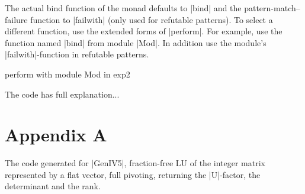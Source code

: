 \documentclass[draft]{elsart}
\begin{document}
The actual bind function of the monad defaults to |bind| and the
pattern-match--failure function to |failwith| (only used for refutable
patterns).  To select a different function, use the
extended forms of |perform|. For example, use the function named 
|bind| from module |Mod|.  In
addition use the module's |failwith|-function in refutable patterns.
\begin{code}
        perform with module Mod in exp2
\end{code}
The code has full explanation...

\section{Appendix A}
The code generated for |GenIV5|, fraction-free LU of the integer matrix
represented by a flat vector, full pivoting, returning the |U|-factor,
the determinant and the rank.
\end{document}

